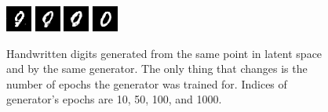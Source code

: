 \begin{figure}[!h]
    \centering
    \includegraphics[scale=2]{figures/mnist/mnist32x32_progress0010.png}
    \includegraphics[scale=2]{figures/mnist/mnist32x32_progress0050.png}
    \includegraphics[scale=2]{figures/mnist/mnist32x32_progress0100.png}
    \includegraphics[scale=2]{figures/mnist/mnist32x32_progress1000.png}
    \caption{\label{fig:mnist-progress}Handwritten digits generated from the same point in latent space and by the same generator. The only thing that changes is the number of epochs the generator was trained for. Indices of generator's epochs are 10, 50, 100, and 1000.}
\end{figure}


